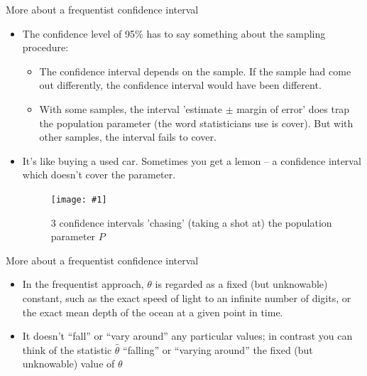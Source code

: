 \documentclass{beamer}\usepackage[]{graphicx}\usepackage[]{color}
\newcommand {\framedgraphiccaption}[2] {
	\begin{figure}
		\centering
		\texttt{[image: \#1]}
		\caption{#2}
	\end{figure}
}
\begin{document}


\begin{frame}{More about a frequentist confidence interval}

\begin{itemize}
	\item The confidence level of 95\% has to say something about the sampling procedure: \pause
		
	\begin{itemize}
		\item The confidence interval depends on the sample. If the sample had come out differently, the confidence interval would have been different. \pause
		\item With some samples, the interval 'estimate $\pm$ margin of error' does trap the population parameter (the word statisticians use is cover). But with other samples, the interval fails to cover.
	\end{itemize}
\pause
\item It's like buying a used car. Sometimes you get a lemon – a confidence interval which doesn't cover the parameter.

\framedgraphiccaption{lemon.jpg}{3 confidence intervals 'chasing' (taking a shot at) the population parameter $P$}
\end{itemize}
\end{frame}


\begin{frame}{More about a frequentist confidence interval}
\begin{itemize}
				\setlength\itemsep{2em}
	\item In the frequentist approach, $\theta$ is regarded as a fixed (but unknowable) constant, such as the exact speed of light to an infinite number of digits, or the exact mean depth of the ocean at a given point in time. \pause
	
	\item It doesn't ``fall'' or ``vary around'' any particular values; in contrast you can think of the statistic $\hat{\theta}$ ``falling'' or ``varying around'' the fixed (but unknowable) value of $\theta$
\end{itemize}
\end{frame}
\end{document}
